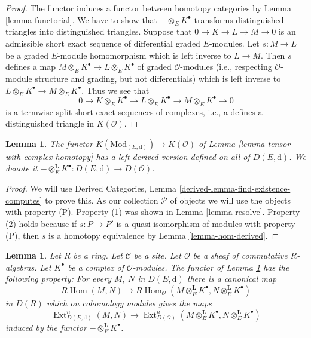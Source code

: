 \documentclass{stacks-project}
\theoremstyle{plain}
\newtheorem{lemma}[subsection]{Lemma}
\theoremstyle{definition}
\theoremstyle{remark}
\numberwithin{equation}{subsection}
\def\Hom{\mathop{\mathrm{Hom}}\nolimits}
\def\Ext{\mathop{\mathrm{Ext}}\nolimits}
\begin{document}
\begin{proof}
The functor induces a functor between homotopy categories by
Lemma \ref{lemma-functorial}.
We have to show that $- \otimes_E K^\bullet$ transforms distinguished
triangles into distinguished triangles.
Suppose that $0 \to K \to L \to M \to 0$ is an admissible short
exact sequence of differential graded $E$-modules. Let $s : M \to L$ be
a graded $E$-module homomorphism which is left inverse to $L \to M$.
Then $s$ defines a map $M \otimes_E K^\bullet \to L \otimes_E K^\bullet$
of graded $\mathcal{O}$-modules (i.e., respecting $\mathcal{O}$-module
structure and grading, but not differentials)
which is left inverse to $L \otimes_E K^\bullet \to M \otimes_E K^\bullet$.
Thus we see that
$$
0 \to K \otimes_E K^\bullet \to L \otimes_E K^\bullet \to
M \otimes_E K^\bullet \to 0
$$
is a termwise split short exact sequences of complexes, i.e., a
defines a distinguished triangle in $K(\mathcal{O})$.
\end{proof}

\begin{lemma}
\label{lemma-tensor-with-complex-derived}
The functor $K(\text{Mod}_{(E, \text{d})}) \to K(\mathcal{O})$
of Lemma \ref{lemma-tensor-with-complex-homotopy} has a left derived
version defined on all of $D(E, \text{d})$. We denote it
$- \otimes_E^\mathbf{L} K^\bullet : D(E, \text{d}) \to D(\mathcal{O})$.
\end{lemma}

\begin{proof}
We will use
Derived Categories, Lemma \ref{derived-lemma-find-existence-computes}
to prove this. As our collection $\mathcal{P}$
of objects we will use the objects with property (P).
Property (1) was shown in Lemma \ref{lemma-resolve}.
Property (2) holds because if $s : P \to P'$ is a quasi-isomorphism
of modules with property (P), then $s$ is a homotopy equivalence
by Lemma \ref{lemma-hom-derived}.
\end{proof}

\begin{lemma}
\label{lemma-upgrade-tensor-with-complex-derived}
Let $R$ be a ring. Let $\mathcal{C}$ be a site. Let $\mathcal{O}$
be a sheaf of commutative $R$-algebras. Let $K^\bullet$
be a complex of $\mathcal{O}$-modules.
The functor
of Lemma \ref{lemma-tensor-with-complex-derived} has the following
property: For every $M$, $N$ in $D(E, \text{d})$ there is a
canonical map
$$
R\Hom(M, N)
\longrightarrow
R\Hom_\mathcal{O}(M \otimes_E^\mathbf{L} K^\bullet,
N \otimes_E^\mathbf{L} K^\bullet)
$$
in $D(R)$ which on cohomology modules gives the maps
$$
\Ext^n_{D(E, \text{d})}(M, N) \to
\Ext^n_{D(\mathcal{O})}
(M \otimes_E^\mathbf{L} K^\bullet, N \otimes_E^\mathbf{L} K^\bullet)
$$
induced by the functor $- \otimes_E^\mathbf{L} K^\bullet$.
\end{lemma}
\end{document}

